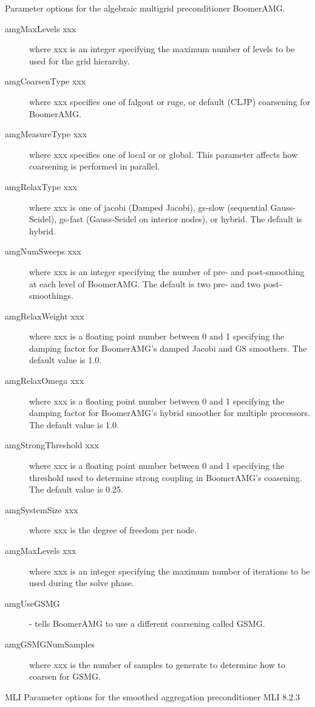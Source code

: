\documentclass{article}
\begin{document}
\begin{cxxentry}
\begin{cxxentry}
\begin{cxxentry}
\begin{cxxdoc}
Parameter options for the algebraic multigrid preconditioner BoomerAMG.

\begin{description}
\item[amgMaxLevels xxx] where xxx is an integer specifying the maximum 
number of levels to be used for the grid hierarchy.
\item[amgCoarsenType xxx] where xxx specifies one of {\sf falgout} or
{\sf ruge}, or {\sf default (CLJP)} coarsening for BoomerAMG.
\item[amgMeasureType xxx] where xxx specifies one of {\sf local} or
or {\sf global}.  This parameter affects how coarsening is 
performed in parallel.
\item[amgRelaxType xxx] where xxx is one of {\sf jacobi} (Damped Jacobi),
{\sf gs-slow} (sequential Gauss-Seidel), {\sf gs-fast}
(Gauss-Seidel on interior nodes), or {\sf hybrid}.
The default is {\sf hybrid}.
\item[amgNumSweeps xxx] where xxx is an integer specifying the number of
pre- and post-smoothing at each level of BoomerAMG.
The default is two pre- and two post-smoothings.
\item[amgRelaxWeight xxx] where xxx is a floating point number between 
0 and 1 specifying the damping factor for BoomerAMG's damped
Jacobi and GS smoothers.  The default value is 1.0.
\item[amgRelaxOmega xxx] where xxx is a floating point number between 
0 and 1 specifying the damping factor for BoomerAMG's hybrid
smoother for multiple processors.  The default value is 1.0.
\item[amgStrongThreshold xxx] where xxx is a floating point number between 0 
and 1 specifying the threshold used to determine
strong coupling in BoomerAMG's coasening.  The default 
value is 0.25.
\item[amgSystemSize xxx] where xxx is the degree of freedom per node.
\item[amgMaxLevels xxx] where xxx is an integer specifying the maximum 
number of iterations to be used during the solve phase.
\item[amgUseGSMG] - tells BoomerAMG to use a different coarsening called 
GSMG.
\item[amgGSMGNumSamples] where xxx is the number of samples to generate
to determine how to coarsen for GSMG.
\end{description}
\end{cxxdoc}
\end{cxxentry}
\begin{cxxentry}
{}
        {MLI}
        {}
        {
Parameter options for the smoothed aggregation preconditioner MLI}
        {8.2.3}
\begin{cxxdoc}


\end{cxxdoc}
\end{cxxentry}
\end{cxxentry}
\end{cxxentry}
\end{document}
